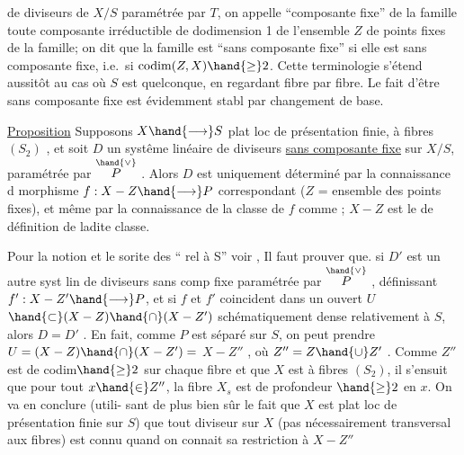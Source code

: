 
de diviseurs de $X/S$ paramétrée par $T$, on appelle ``composante fixe'' de la
famille toute composante irréductible de dodimension 1 de l'ensemble $Z$ de
points fixes de la famille; on dit que la famille est ``sans composante
fixe'' si elle est sans composante fixe, i.e.\ si $\operatorname{codim}(Z,X) \hand{\geq} 2$. Cette
terminologie s'étend aussitôt au cas où $S$ est quelconque, en regardant
fibre par fibre. Le fait d'être sans composante fixe est évidemment stabl
par changement de base.

\uline{Proposition} \hand{/}Supposons $X \hand{\longrightarrow} S$ plat loc de présentation finie, à fibres
$(S_2)$ , et soit $D$ un systême linéaire de diviseurs \uline{sans composante fixe}
sur $X/S$, paramétrée par $\overset{\hand{\vee}}{P}$ . Alors $D$ est uniquement déterminé par la
connaissance d morphisme $f: X - Z \hand{\longrightarrow} P$ correspondant ($Z$ = ensemble
des points fixes), et même par la connaissance de la classe de $f$ comme
  ; $X-Z$ est le 
de définition de ladite classe.

Pour la notion et le sorite des ``
rel à S'' voir  ,  Il faut prouver que.
si  $D'$ est un
autre syst lin de diviseurs sans comp fixe paramétrée par $\overset{\hand{\vee}}{P}$ , 
définissant $f': X-Z' \hand{\longrightarrow} P$, et si $f$ et $f'$ coincident dans un ouvert $U$
$\hand{\subset} (X-Z)\hand{\cap}(X-Z')$ schématiquement dense relativement à $S$, alors $D=D'$ .
En fait, comme $P$ est séparé sur $S$, on peut prendre $U=(X-Z)\hand{\cap}(X-Z') =$
 $X-Z''$ , où $Z'' = Z\hand{\cup}Z'$ . Comme $Z''$ est de codim$\hand{\geq}2$
sur chaque fibre et que $X$ est à fibres $(S_2)$, il s'ensuit que pour tout
$x\hand{\in} Z''$, la fibre $X_s$ est de profondeur $\hand{\geq}2$ en $x$. On va en conclure (utili-%
sant de plus bien sûr le fait que $X$ est plat loc de présentation finie
sur $S$) que tout diviseur  sur $X$ (pas nécessairement 
transversal aux fibres) est connu quand on connait sa restriction à $X-Z''$

